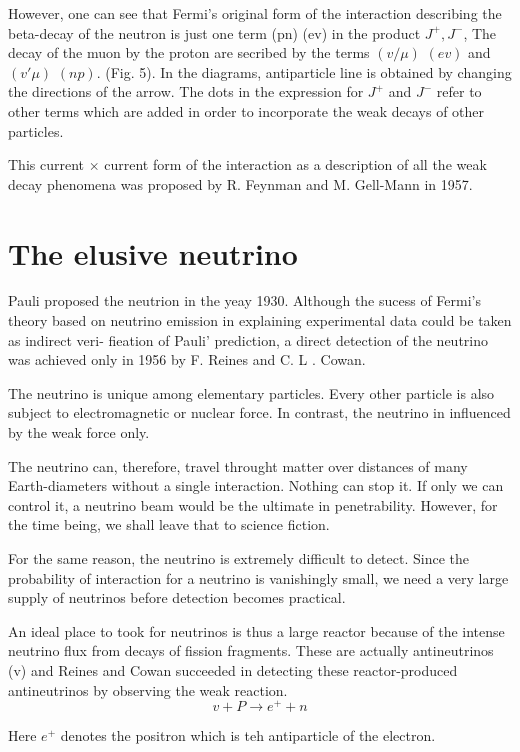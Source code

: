 However, one can see that Fermi's original form of the interaction describing the beta-decay of the neutron is just one term (pn) (ev) in the product $J^{+}, J^{-}$, The decay of the muon by the proton are secribed by the terms $(v/ \mu)$ $(e v)$ and $(v' \mu)$  $(n p)$. (Fig. 5). In the diagrams, antiparticle line is obtained by changing the directions of the arrow. The dots in the expression for $J^{+}$ and $J^{-}$ refer to other terms which are added in order to incorporate the weak decays of other particles.

This current $\times$ current form of the interaction as a description of all the weak decay phenomena was proposed by R. Feynman and M. Gell-Mann in 1957.

\section*{The elusive neutrino}

Pauli proposed the neutrion in the yeay 1930. Although the sucess of Fermi's theory based on neutrino emission in explaining experimental data could be taken as indirect veri- fieation of Pauli' prediction, a direct detection of the neutrino was achieved only in 1956 by F. Reines and C. L . Cowan.

The neutrino is unique among elementary particles. Every other particle is also subject to electromagnetic or nuclear force. In contrast, the neutrino in influenced by the weak force only.

The neutrino can, therefore, travel throught matter over distances of many Earth-diameters without a single interaction. Nothing can stop it. If only we can control it, a neutrino beam would be the ultimate in penetrability. However, for the time being, we shall leave that to science fiction.

For the same reason, the neutrino is extremely difficult to detect. Since the probability of interaction for a neutrino is vanishingly small, we need a very large supply of neutrinos before detection becomes practical.

An ideal place to took for neutrinos is thus a large reactor because of the intense neutrino flux from decays of fission fragments. These are actually antineutrinos (v) and Reines and Cowan succeeded in detecting these reactor-produced antineutrinos by observing the weak reaction.
$$
v + P \rightarrow  e^{+} + n
$$

Here $e^{+}$ denotes the positron which is teh antiparticle of the electron.

